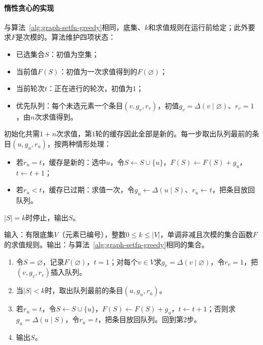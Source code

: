 \paragraph{惰性贪心的实现}
与算法~\ref{alg:graph-setfn-greedy}相同，底集、$k$和求值规则在运行前给定；此外要求$F$是次模的。算法维护四项状态：
\begin{itemize}
  \item 已选集合$S$：初值为空集；
  \item 当前值$F(S)$：初值为一次求值得到的$F(\varnothing)$；
  \item 当前轮次$t$：正在进行的轮次，初值为$1$；
  \item 优先队列：每个未选元素一个条目$(v,g_v,r_v)$，初值$g_v=\Delta(v\mid\varnothing)$、$r_v=1$，由$n$次求值得到。
\end{itemize}
初始化共需$1+n$次求值，第$1$轮的缓存因此全部是新的。每一步取出队列最前的条目$(u,g_u,r_u)$，按两种情形处理：
\begin{itemize}
  \item 若$r_u=t$，缓存是新的：选中$u$，令$S\gets S\cup\{u\}$，$F(S)\gets F(S)+g_u$，$t\gets t+1$；
  \item 若$r_u<t$，缓存已过期：求值一次，令$g_u\gets\Delta(u\mid S)$、$r_u\gets t$，把条目放回队列。
\end{itemize}
$|S|=k$时停止，输出$S$。

\begin{algorithm}[惰性贪心]
\label{alg:graph-setfn-lazy-greedy}
输入：有限底集$V$（元素已编号），整数$0\leq k\leq|V|$，单调非减且次模的集合函数$F$的求值规则。输出：与算法~\ref{alg:graph-setfn-greedy}相同的集合。
\begin{enumerate}
  \item 令$S=\varnothing$，记录$F(\varnothing)$，$t=1$；对每个$v\in V$求$g_v=\Delta(v\mid\varnothing)$，令$r_v=1$，把$(v,g_v,r_v)$插入队列。
  \item 当$|S|<k$时，取出队列最前的条目$(u,g_u,r_u)$。
  \item 若$r_u=t$，令$S\gets S\cup\{u\}$，$F(S)\gets F(S)+g_u$，$t\gets t+1$；否则求$g_u=\Delta(u\mid S)$，令$r_u=t$，把条目放回队列。回到第2步。
  \item 输出$S$。
\end{enumerate}
\end{algorithm}

